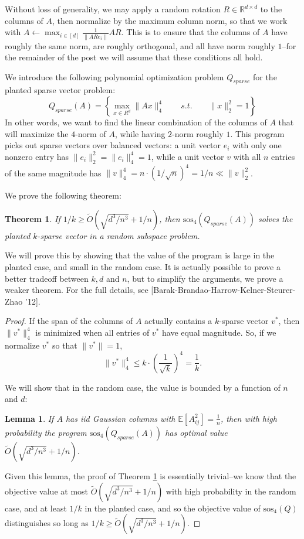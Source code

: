 \documentclass[a4paper,11pt]{article}
\newcommand{\R}{\mathbb{R}}
\newcommand{\E}{\mathbb{E}}
\newcommand{\sos}{\mathrm{sos}}
\newtheorem{theorem}{Theorem}
\newtheorem{lemma}{Lemma}
\theoremstyle{definition}
\begin{document}
Without loss of generality, we may apply a random rotation $R \in \R^{d\times d}$ to the columns of $A$, then normalize by the maximum column norm, so that we work with $A \leftarrow \max_{i\in[d]} \frac{1}{\|ARe_i\|}AR$.
This is to ensure that the columns of $A$ have roughly the same norm, are roughly orthogonal, and all have norm roughly $1$--for the remainder of the post we will assume that these conditions all hold.

We introduce the following polynomial optimization problem $Q_{sparse}$ for the planted sparse vector problem:
\[
Q_{sparse}(A) = \left\{
\max_{x \in R^d} \| Ax \|^4_4 \qquad s.t. \qquad \|x\|^2_2 = 1
\right\}
\]
In other words, we want to find the linear combination of the columns of $A$ that will maximize the $4$-norm of $A$, while having $2$-norm roughly $1$.
This program picks out sparse vectors over balanced vectors: a unit vector $e_i$ with only one nonzero entry has $\|e_i\|^2_2 = \|e_i\|^4_4 = 1$, while a unit vector $v$ with all $n$ entries of the same magnitude has $\|v\|_4^4 = n \cdot (1/\sqrt{n})^4 = 1/n \ll \|v\|_2^2$.

We prove the following theorem:
\begin{theorem}\label{thm:plsp}
If $1/k \ge \tilde{O}(\sqrt{d^3/n^3} + 1/n)$, then $\sos_4(Q_{sparse}(A))$ solves the planted $k$-sparse vector in a random subspace problem.
\end{theorem}

We will prove this by showing that the value of the program is large in the planted case, and small in the random case.
It is actually possible to prove a better tradeoff between $k,d$ and $n$, but to simplify the arguments, we prove a weaker theorem.
For the full details, see [Barak-Brandao-Harrow-Kelner-Steurer-Zhao '12].

\begin{proof}
If the span of the columns of $A$ actually contains a $k$-sparse vector $v^*$, then $\|v^*\|_4^4$ is minimized when all entries of $v^*$ have equal magnitude.
So, if we normalize $v^*$ so that $\|v^*\| = 1$,
\[
\|v^*\|^4_4 \le k\cdot \left(\frac{1}{\sqrt{k}}\right)^{4} = \frac{1}{k}.
\]

We will show that in the random case, the value is bounded by a function of $n$ and $d$:
\begin{lemma}\label{lem:randomcase}
If $A$ has iid Gaussian columns with $\E[A_{ij}^2] = \frac{1}{n}$,
then with high probability the program $\sos_4(Q_{sparse}(A))$ has optimal value $\tilde{O}(\sqrt{d^3/n^3} + 1/n)$.
\end{lemma}
Given this lemma, the proof of Theorem \ref{thm:plsp} is essentially trivial--we know that the objective value at most $\tilde{O}(\sqrt{d^3/n^3} + 1/n)$ with high probability in the random case, and at least $1/k$ in the planted case, and so the objective value of $\sos_4(Q)$ distinguishes so long as $1/k \ge\tilde{O}(\sqrt{d^3/n^3} + 1/n)$.
\end{proof}
\end{document}
